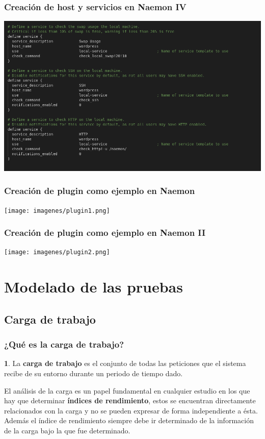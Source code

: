 \documentclass{beamer}
\theoremstyle{plain}
\theoremstyle{definition}
\newtheorem{defn}[thm]{}
\theoremstyle{plain}
\theoremstyle{definition}
\theoremstyle{remark}
\theoremstyle{definition}
\begin{document}
\begin{frame}
	\frametitle{Creación de host y servicios en Naemon IV}
	
	
	\centering
	\includegraphics[scale=0.3]{imagenes/analisis_naemon/services2.png}
	
\end{frame}
\begin{frame}
	\frametitle{Creación de plugin como ejemplo en Naemon}
	 
	\centering
	\texttt{[image: imagenes/plugin1.png]}
		
\end{frame}
\begin{frame}
		\frametitle{Creación de plugin como ejemplo en Naemon II}
		
		\centering
		
	\texttt{[image: imagenes/plugin2.png]}
	
\end{frame}



\section{Modelado de las pruebas} %
\subsection{Carga de trabajo}
\begin{frame}
	\frametitle{¿Qué es la carga de trabajo?}
	\begin{defn}
		La \textbf{carga de trabajo} es el conjunto de todas las peticiones que el sistema recibe de su entorno
		durante un periodo de tiempo dado.
	\end{defn}
El análisis de la carga es un papel fundamental en cualquier
estudio en los que hay que determinar \textbf{índices de rendimiento}, estos se
encuentran directamente relacionados con la carga y no se pueden expresar
de forma independiente a ésta. Además el índice de rendimiento siempre debe
ir determinado de la información de la carga bajo la que fue determinado.
	
\end{frame}
\end{document}
